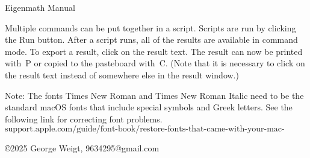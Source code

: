 

\begin{center}
{\LARGE Eigenmath Manual}
\end{center}

\begin{center}
\end{center}

Multiple commands can be put together in a script.
Scripts are run by clicking the Run button.
After a script runs, all of the results are available in command mode.
To export a result, click on the result text.
The result can now be printed with \cmd$\,$P or copied to the pasteboard with \cmd$\,$C.
(Note that it is necessary to click on the result text
instead of somewhere else in the result window.)

\bigskip
Note: The fonts Times New Roman and Times New Roman Italic need
to be the standard macOS fonts that include special symbols and Greek letters.
See the following link for correcting font problems.
\begin{equation*}
\boxed{\text{support.apple.com/guide/font-book/restore-fonts-that-came-with-your-mac-fb34862/mac}}
\end{equation*}

\vfill
\copyright 2025 George Weigt, 9634295@gmail.com
\newpage

\tableofcontents


